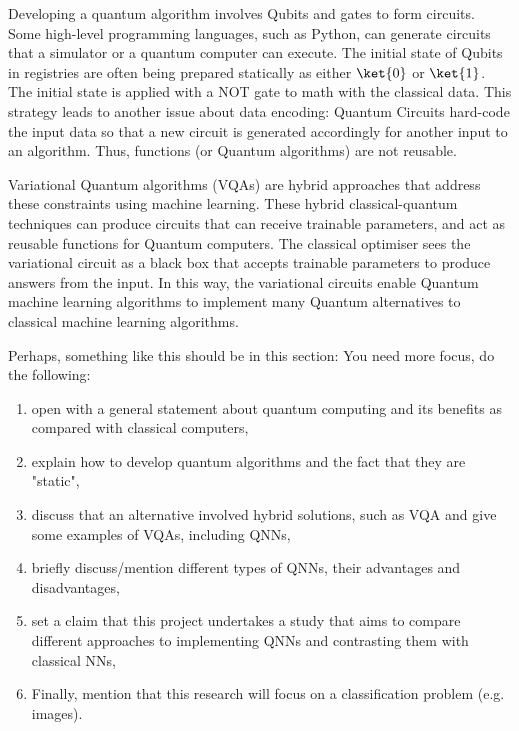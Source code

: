 Developing a quantum algorithm involves Qubits and gates to form circuits. 
Some high-level programming languages, such as Python, can generate circuits that a simulator or a quantum computer can execute. 
The initial state of Qubits in registries are often being prepared statically as either  $\ket{0}$ or $\ket{1}$. 
The initial state is  applied with a NOT gate to math with the classical data.
This strategy  leads to another issue about data encoding: Quantum Circuits hard-code the input data so that a new circuit is generated accordingly for another input to an algorithm. 
Thus, functions (or Quantum algorithms) are not reusable.

Variational Quantum algorithms (VQAs) \cite{cerezo2021variational} are hybrid approaches that address these constraints using machine learning.
These hybrid classical-quantum techniques can produce circuits that can receive trainable parameters, and act as reusable functions for Quantum computers.
The classical optimiser sees the variational circuit as a black box that accepts trainable parameters to produce answers from the input. 
In this way, the variational circuits enable Quantum machine learning algorithms to implement many Quantum alternatives to classical machine learning algorithms.



Perhaps, something like this should be in this section: You need more focus, do the following:
\begin{enumerate}
    \item open with a general statement about quantum computing and its benefits as compared with classical computers, 
    \item explain how to  develop quantum algorithms and the fact that they are "static",
    \item discuss that an alternative involved hybrid solutions, such as VQA and give some examples of VQAs, including QNNs, 
    \item briefly discuss/mention different types of QNNs, their advantages and disadvantages, 
    \item set a claim that this project undertakes a study that aims to compare different approaches to implementing QNNs and contrasting them with classical NNs, 
    \item Finally, mention that this research will focus on a classification problem (e.g. images).
\end{enumerate}